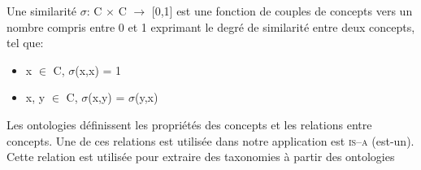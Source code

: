 


\begin{mydef}
  Une similarité $\sigma$: C $\times$ C $\rightarrow$ [0,1] est une
  fonction de couples de concepts vers un nombre compris entre 0 et 1
  exprimant le degré de similarité entre deux concepts, tel que:
  \SpecialItem
  \begin{itemize}
  \item x $\in$ C, $\sigma$(x,x) = 1
  \item x, y $\in$ C, $\sigma$(x,y) = $\sigma$(y,x)
  \end{itemize}
\end{mydef}

Les ontologies définissent les propriétés des concepts et les
relations entre concepts. Une de ces relations est utilisée dans notre
application est \textsc{is–a} (est-un). Cette relation est utilisée
pour extraire des taxonomies à partir des ontologies

